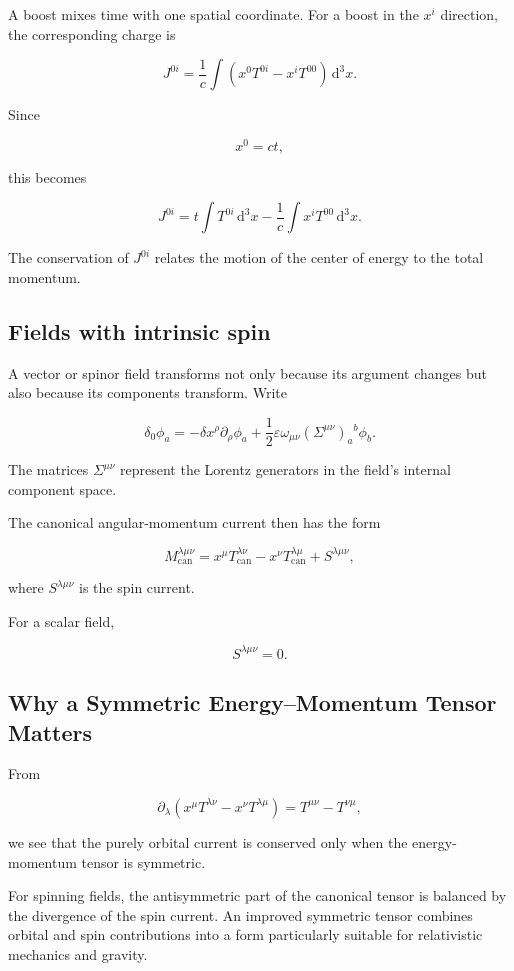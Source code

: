 A boost mixes time with one spatial coordinate. For a boost in the \(x^i\) direction, the corresponding charge is

\[
J^{0i}
=
\frac{1}{c}
\int
\left(
x^{0}T^{0i}
-
x^{i}T^{00}
\right)
\,\mathrm{d}^{3}x.
\]

Since

\[
x^{0}=ct,
\]

this becomes

\[
J^{0i}
=
t
\int
T^{0i}
\,\mathrm{d}^{3}x
-
\frac{1}{c}
\int
x^{i}T^{00}
\,\mathrm{d}^{3}x.
\]

The conservation of \(J^{0i}\) relates the motion of the center of energy to the total momentum.

\subsection{Fields with intrinsic spin}

A vector or spinor field transforms not only because its argument changes but also because its components transform. Write

\[
\delta_0\phi_a
=
-\delta x^{\rho}\partial_{\rho}\phi_a
+
\frac{1}{2}
\varepsilon
\omega_{\mu\nu}
\left(
\Sigma^{\mu\nu}
\right)_a{}^b
\phi_b.
\]

The matrices \(\Sigma^{\mu\nu}\) represent the Lorentz generators in the field's internal component space.

The canonical angular-momentum current then has the form

\[
\boxed{
M_{\mathrm{can}}^{\lambda\mu\nu}
=
x^{\mu}T_{\mathrm{can}}^{\lambda\nu}
-
x^{\nu}T_{\mathrm{can}}^{\lambda\mu}
+
S^{\lambda\mu\nu}
},
\]

where \(S^{\lambda\mu\nu}\) is the spin current.

For a scalar field,

\[
S^{\lambda\mu\nu}=0.
\]

\subsection{Why a Symmetric Energy--Momentum Tensor Matters}

From

\[
\partial_{\lambda}
\left(
x^{\mu}T^{\lambda\nu}
-
x^{\nu}T^{\lambda\mu}
\right)
=
T^{\mu\nu}-T^{\nu\mu},
\]

we see that the purely orbital current is conserved only when the energy-momentum tensor is symmetric.

For spinning fields, the antisymmetric part of the canonical tensor is balanced by the divergence of the spin current. An improved symmetric tensor combines orbital and spin contributions into a form particularly suitable for relativistic mechanics and gravity.

